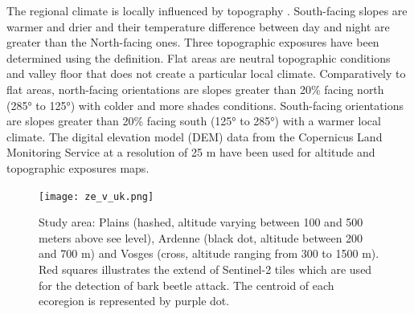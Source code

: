 \documentclass[3p,procedia]{elsarticle}
\begin{document}
The regional climate is locally influenced by topography \citep{de_frenne_forest_2021}.
South-facing slopes are warmer and drier and their temperature difference between day and night are greater than the North-facing ones.
Three topographic exposures have been determined using the \cite{Delvaux_galoux} definition.
Flat areas are neutral topographic conditions and valley floor that does not create a particular local climate.
Comparatively to flat areas, north-facing orientations are slopes greater than  20\% facing north (285° to 125°) with colder and more shades conditions.
South-facing orientations are slopes greater than  20\% facing south (125° to 285°) with a warmer local climate.
The digital elevation model (DEM) data from the Copernicus Land Monitoring Service \citep{DEM_copernicus} at a resolution of 25 m have been used for altitude and topographic exposures maps.

\begin{figure} [htbp] 
	\centering
	\texttt{[image: ze\_v\_uk.png]}
	\caption{Study area: Plains (hashed, altitude varying between 100 and 500 meters above see level), Ardenne (black dot, altitude between 200 and 700 m) and Vosges (cross, altitude ranging from 300 to 1500 m). Red squares illustrates the extend of Sentinel-2 tiles which are used for the detection of bark beetle attack. The centroid of each ecoregion is represented by purple dot.}
	\label{fig:situ}
\end{figure}
\end{document}
